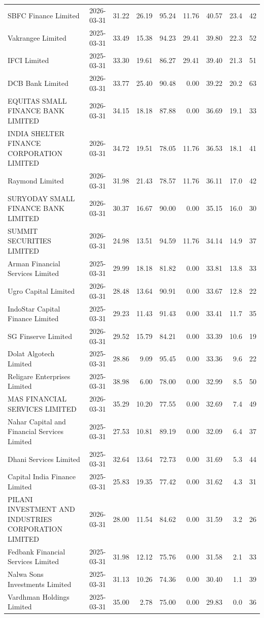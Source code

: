 {\begin{longtable}{@{}L{5.1cm}rrrrrrrr@{}}
SBFC Finance Limited & 2026-03-31 & 31.22 & 26.19 & 95.24 & 11.76 & 40.57 & 23.4 & 42 \\
Vakrangee Limited & 2025-03-31 & 33.49 & 15.38 & 94.23 & 29.41 & 39.80 & 22.3 & 52 \\
IFCI Limited & 2025-03-31 & 33.30 & 19.61 & 86.27 & 29.41 & 39.40 & 21.3 & 51 \\
DCB Bank Limited & 2026-03-31 & 33.77 & 25.40 & 90.48 & 0.00 & 39.22 & 20.2 & 63 \\
EQUITAS SMALL FINANCE BANK LIMITED & 2026-03-31 & 34.15 & 18.18 & 87.88 & 0.00 & 36.69 & 19.1 & 33 \\
INDIA SHELTER FINANCE CORPORATION LIMITED & 2026-03-31 & 34.72 & 19.51 & 78.05 & 11.76 & 36.53 & 18.1 & 41 \\
Raymond Limited & 2026-03-31 & 31.98 & 21.43 & 78.57 & 11.76 & 36.11 & 17.0 & 42 \\
SURYODAY SMALL FINANCE BANK LIMITED & 2026-03-31 & 30.37 & 16.67 & 90.00 & 0.00 & 35.15 & 16.0 & 30 \\
SUMMIT SECURITIES LIMITED & 2026-03-31 & 24.98 & 13.51 & 94.59 & 11.76 & 34.14 & 14.9 & 37 \\
Arman Financial Services Limited & 2025-03-31 & 29.99 & 18.18 & 81.82 & 0.00 & 33.81 & 13.8 & 33 \\
Ugro Capital Limited & 2026-03-31 & 28.48 & 13.64 & 90.91 & 0.00 & 33.67 & 12.8 & 22 \\
IndoStar Capital Finance Limited & 2025-03-31 & 29.23 & 11.43 & 91.43 & 0.00 & 33.41 & 11.7 & 35 \\
SG Finserve Limited & 2026-03-31 & 29.52 & 15.79 & 84.21 & 0.00 & 33.39 & 10.6 & 19 \\
Dolat Algotech Limited & 2025-03-31 & 28.86 & 9.09 & 95.45 & 0.00 & 33.36 & 9.6 & 22 \\
Religare Enterprises Limited & 2025-03-31 & 38.98 & 6.00 & 78.00 & 0.00 & 32.99 & 8.5 & 50 \\
MAS FINANCIAL SERVICES LIMITED & 2026-03-31 & 35.29 & 10.20 & 77.55 & 0.00 & 32.69 & 7.4 & 49 \\
Nahar Capital and Financial Services Limited & 2025-03-31 & 27.53 & 10.81 & 89.19 & 0.00 & 32.09 & 6.4 & 37 \\
Dhani Services Limited & 2025-03-31 & 32.64 & 13.64 & 72.73 & 0.00 & 31.69 & 5.3 & 44 \\
Capital India Finance Limited & 2025-03-31 & 25.83 & 19.35 & 77.42 & 0.00 & 31.62 & 4.3 & 31 \\
PILANI INVESTMENT AND INDUSTRIES CORPORATION LIMITED & 2026-03-31 & 28.00 & 11.54 & 84.62 & 0.00 & 31.59 & 3.2 & 26 \\
Fedbank Financial Services Limited & 2025-03-31 & 31.98 & 12.12 & 75.76 & 0.00 & 31.58 & 2.1 & 33 \\
Nalwa Sons Investments Limited & 2025-03-31 & 31.13 & 10.26 & 74.36 & 0.00 & 30.40 & 1.1 & 39 \\
Vardhman Holdings Limited & 2025-03-31 & 35.00 & 2.78 & 75.00 & 0.00 & 29.83 & 0.0 & 36 \\
\end{longtable}}

